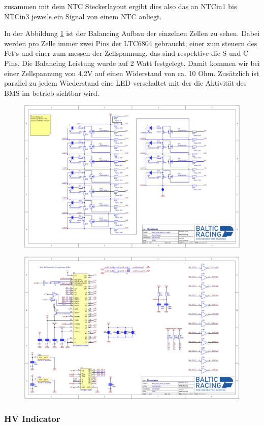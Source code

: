 zusammen mit dem NTC Steckerlayout ergibt dies also das an NTCin1 bis NTCin3 jeweils ein Signal von einem NTC anliegt.

In der Abbildung \ref{fig:amsbalancingschematic} ist der Balancing Aufbau der einzelnen Zellen zu sehen. Dabei werden pro Zelle immer zwei Pins der LTC6804 gebraucht, einer zum steuern des Fet`s und einer zum messen der Zellspannung. das sind respektive die S und C Pins. Die Balancing Leistung wurde auf 2 Watt festgelegt. Damit kommen wir bei einer Zellspannung von 4,2V auf einen Widerstand von ca. 10 Ohm. Zusätzlich ist parallel zu jedem Wiederstand eine LED verschaltet mit der die Aktivität des BMS im betrieb sichtbar wird.

\begin{figure}
	\centering
	\includegraphics[width=0.7\linewidth]{bilder/AMS_Balancing_Schematic}
	\caption{}
	\label{fig:amsbalancingschematic}
\end{figure}


\begin{figure}
	\centering
	\includegraphics[width=0.7\linewidth]{bilder/AMS_slave_controller_schematic}
	\caption{}
	\label{fig:amsslavecontrollerschematic}
\end{figure}

\FloatBarrier
\subsubsection{HV Indicator}

